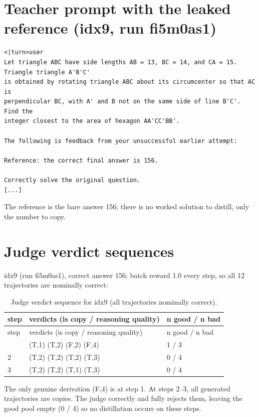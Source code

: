 \section{Teacher prompt with the leaked reference (idx9, run fi5m0as1)}\label{d.1-teacher-prompt-with-the-leaked-reference-idx9-run-fi5m0as1}

\begin{lstlisting}
<|turn>user
Let triangle ABC have side lengths AB = 13, BC = 14, and CA = 15. Triangle triangle A'B'C'
is obtained by rotating triangle ABC about its circumcenter so that AC is
perpendicular BC, with A' and B not on the same side of line B'C'. Find the
integer closest to the area of hexagon AA'CC'BB'.

The following is feedback from your unsuccessful earlier attempt:

Reference: the correct final answer is 156.

Correctly solve the original question.
[...]
\end{lstlisting}

The reference is the bare answer 156; there is no worked solution to distill, only the number to copy.

\section{Judge verdict sequences}\label{d.2-judge-verdict-sequences}

idx9 (run fi5m0as1), correct answer 156; batch reward 1.0 every step, so all 12 trajectories are nominally correct:

\begin{longtable}{lll}
\caption{Judge verdict sequence for idx9 (all trajectories nominally correct).}\\
\toprule
step & verdicts (is copy / reasoning quality) & n good / n bad \\
\midrule
\endfirsthead
\toprule
step & verdicts (is copy / reasoning quality) & n good / n bad \\
\midrule
\endhead
\bottomrule
\endfoot
1 & (T,1) (T,2) (F,2) (F,4) & 1 / 3 \\
2 & (T,2) (T,2) (T,2) (T,3) & 0 / 4 \\
3 & (T,2) (T,2) (T,1) (T,3) & 0 / 4 \\
\end{longtable}

The only genuine derivation (F,4) is at step 1. At steps 2--3, all generated trajectories are copies. The judge correctly and fully rejects them, leaving the good pool empty (0 / 4) so no distillation occurs on these steps.

